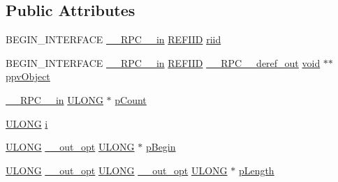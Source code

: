 \subsection*{Public Attributes}
\begin{DoxyCompactItemize}
\item 
B\+E\+G\+I\+N\+\_\+\+I\+N\+T\+E\+R\+F\+A\+CE \hyperlink{rpcsal_8h_a20b7f6da600a05c8b541659f14f7f0e6}{\+\_\+\+\_\+\+R\+P\+C\+\_\+\+\_\+in} \hyperlink{px__win__ds_8c_a80ec49c8ae61e234197d5071d2df497d}{R\+E\+F\+I\+ID} \hyperlink{struct_i_token_collection_vtbl_ac2b94a2a7839b1f516676e35e4f01535}{riid}
\item 
B\+E\+G\+I\+N\+\_\+\+I\+N\+T\+E\+R\+F\+A\+CE \hyperlink{rpcsal_8h_a20b7f6da600a05c8b541659f14f7f0e6}{\+\_\+\+\_\+\+R\+P\+C\+\_\+\+\_\+in} \hyperlink{px__win__ds_8c_a80ec49c8ae61e234197d5071d2df497d}{R\+E\+F\+I\+ID} \hyperlink{rpcsal_8h_a23bc188526f10656f9c79d950f6c3192}{\+\_\+\+\_\+\+R\+P\+C\+\_\+\+\_\+deref\+\_\+out} \hyperlink{sound_8c_ae35f5844602719cf66324f4de2a658b3}{void} $\ast$$\ast$ \hyperlink{struct_i_token_collection_vtbl_aa707e89d6eac199c9039cfe3c8a2d3d2}{ppv\+Object}
\item 
\hyperlink{rpcsal_8h_a20b7f6da600a05c8b541659f14f7f0e6}{\+\_\+\+\_\+\+R\+P\+C\+\_\+\+\_\+in} \hyperlink{struct_i_token_collection_vtbl_a64e68d6f7922dc053fbdcaa8dc4d08b2}{U\+L\+O\+NG} $\ast$ \hyperlink{struct_i_token_collection_vtbl_aa05621489858bf548adf5b16f07acbf3}{p\+Count}
\item 
\hyperlink{struct_i_token_collection_vtbl_a64e68d6f7922dc053fbdcaa8dc4d08b2}{U\+L\+O\+NG} \hyperlink{struct_i_token_collection_vtbl_a7040ff90bef7c15cd25d9dcae4a7645c}{i}
\item 
\hyperlink{struct_i_token_collection_vtbl_a64e68d6f7922dc053fbdcaa8dc4d08b2}{U\+L\+O\+NG} \hyperlink{sal_8h_a1ab4597e9d0c9bcc3f676c58b25019fe}{\+\_\+\+\_\+out\+\_\+opt} \hyperlink{struct_i_token_collection_vtbl_a64e68d6f7922dc053fbdcaa8dc4d08b2}{U\+L\+O\+NG} $\ast$ \hyperlink{struct_i_token_collection_vtbl_a2bfce01e747606db0521488c4a894d9f}{p\+Begin}
\item 
\hyperlink{struct_i_token_collection_vtbl_a64e68d6f7922dc053fbdcaa8dc4d08b2}{U\+L\+O\+NG} \hyperlink{sal_8h_a1ab4597e9d0c9bcc3f676c58b25019fe}{\+\_\+\+\_\+out\+\_\+opt} \hyperlink{struct_i_token_collection_vtbl_a64e68d6f7922dc053fbdcaa8dc4d08b2}{U\+L\+O\+NG} \hyperlink{sal_8h_a1ab4597e9d0c9bcc3f676c58b25019fe}{\+\_\+\+\_\+out\+\_\+opt} \hyperlink{struct_i_token_collection_vtbl_a64e68d6f7922dc053fbdcaa8dc4d08b2}{U\+L\+O\+NG} $\ast$ \hyperlink{struct_i_token_collection_vtbl_a2210830ee15e64acb5fef709dbdf4f09}{p\+Length}
$$
\end{DoxyCompactItemize}
